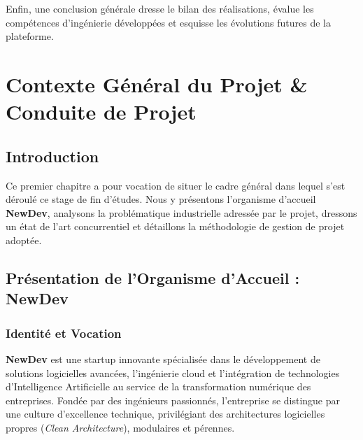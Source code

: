 \documentclass[12pt,a4paper,twoside,openright]{report}
\begin{document}
  Enfin, une conclusion g\'en\'erale dresse le bilan des r\'ealisations, \'evalue les comp\'etences d'ing\'enierie d\'evelopp\'ees et esquisse les \'evolutions futures de la plateforme.

  \newpage

  \chapter{Contexte G\'en\'eral du Projet \& Conduite de Projet}

  \section{Introduction}
  Ce premier chapitre a pour vocation de situer le cadre g\'en\'eral dans lequel s'est d\'eroul\'e ce stage de fin d'\'etudes. Nous y pr\'esentons l'organisme d'accueil \textbf{NewDev}, analysons la probl\'ematique industrielle adress\'ee par le projet, dressons un \'etat de l'art concurrentiel et d\'etaillons la m\'ethodologie de gestion de projet adopt\'ee.

  \section{Pr\'esentation de l'Organisme d'Accueil : NewDev}
  \subsection{Identit\'e et Vocation}
  \textbf{NewDev} est une startup innovante sp\'ecialis\'ee dans le d\'eveloppement de solutions logicielles avanc\'ees, l'ing\'enierie cloud et l'int\'egration de technologies d'Intelligence Artificielle au service de la transformation num\'erique des entreprises. Fond\'ee par des ing\'enieurs passionn\'es, l'entreprise se distingue par une culture d'excellence technique, privil\'egiant des architectures logicielles propres (\textit{Clean Architecture}), modulaires et p\'erennes.
\end{document}
